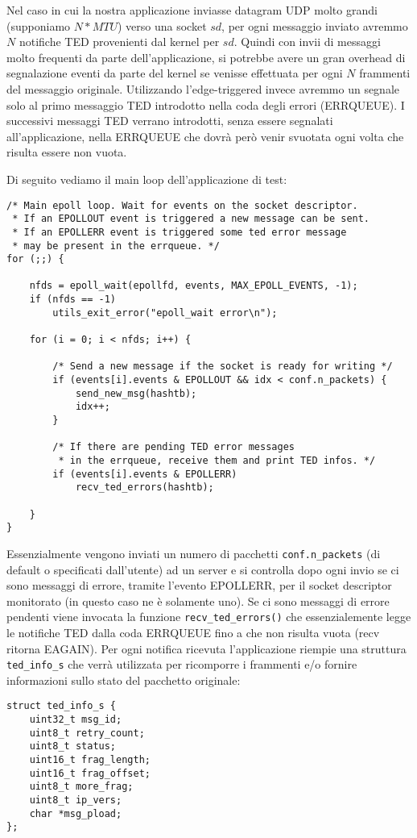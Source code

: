 \documentclass[a4paper,10pt]{article}
\begin{document}
Nel caso in cui la nostra applicazione inviasse datagram UDP molto
grandi (supponiamo $N*MTU$) verso una socket $sd$, per ogni messaggio 
inviato avremmo $N$ notifiche TED provenienti dal kernel per $sd$. 
Quindi con invii di messaggi molto frequenti da parte
dell'applicazione, si potrebbe avere un gran overhead di segnalazione
eventi da parte del kernel se venisse effettuata per ogni $N$ frammenti
del messaggio originale. Utilizzando l'edge-triggered invece avremmo un
segnale solo al primo messaggio TED introdotto nella coda degli errori
(ERRQUEUE). I successivi messaggi TED verrano introdotti, senza essere
segnalati all'applicazione, nella ERRQUEUE che dovrà però venir svuotata ogni
volta che risulta essere non vuota.

Di seguito vediamo il main loop dell'applicazione di test:
\begin{lstlisting}
/* Main epoll loop. Wait for events on the socket descriptor.
 * If an EPOLLOUT event is triggered a new message can be sent.
 * If an EPOLLERR event is triggered some ted error message 
 * may be present in the errqueue. */
for (;;) {

	nfds = epoll_wait(epollfd, events, MAX_EPOLL_EVENTS, -1);
	if (nfds == -1)
		utils_exit_error("epoll_wait error\n");
	
	for (i = 0; i < nfds; i++) {

		/* Send a new message if the socket is ready for writing */
		if (events[i].events & EPOLLOUT && idx < conf.n_packets) {
			send_new_msg(hashtb);
			idx++;
		}

		/* If there are pending TED error messages 
		 * in the errqueue, receive them and print TED infos. */
		if (events[i].events & EPOLLERR)
			recv_ted_errors(hashtb);

	}
}

\end{lstlisting}

Essenzialmente vengono inviati un numero di pacchetti
\texttt{conf.n\_packets}
(di default o specificati dall'utente) ad un server e si controlla dopo
ogni invio se ci sono messaggi di errore, tramite l'evento EPOLLERR, per
il socket descriptor monitorato (in questo caso ne è solamente uno).
Se ci sono messaggi di errore pendenti viene invocata la funzione 
\texttt{recv\_ted\_errors()} che essenzialemente legge le notifiche TED 
dalla coda ERRQUEUE fino a che non risulta vuota (recv ritorna EAGAIN).
Per ogni notifica ricevuta l'applicazione riempie una struttura
\texttt{ted\_info\_s} che verrà utilizzata per ricomporre i frammenti
e/o fornire informazioni
sullo stato del pacchetto originale:
\begin{lstlisting}
struct ted_info_s {
	uint32_t msg_id;
	uint8_t retry_count;
	uint8_t status;
	uint16_t frag_length;
	uint16_t frag_offset;
	uint8_t more_frag;
	uint8_t ip_vers;
	char *msg_pload;
};
\end{lstlisting}
\end{document}
